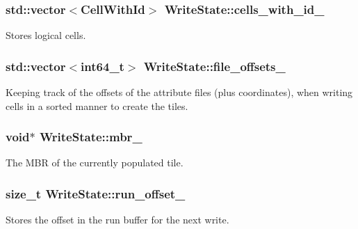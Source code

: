 \subsubsection[{cells\+\_\+with\+\_\+id\+\_\+}]{\setlength{\rightskip}{0pt plus 5cm}std\+::vector$<${\bf Cell\+With\+Id}$>$ Write\+State\+::cells\+\_\+with\+\_\+id\+\_\+\hspace{0.3cm}{\ttfamily [private]}}\label{structWriteState_a296e22c27c0c1965771670d3bdd2dfd5}
Stores logical cells. \hypertarget{structWriteState_a94e403575a527bf5b592cd56b37312a9}{}
\subsubsection[{file\+\_\+offsets\+\_\+}]{\setlength{\rightskip}{0pt plus 5cm}std\+::vector$<$int64\+\_\+t$>$ Write\+State\+::file\+\_\+offsets\+\_\+\hspace{0.3cm}{\ttfamily [private]}}\label{structWriteState_a94e403575a527bf5b592cd56b37312a9}
Keeping track of the offsets of the attribute files (plus coordinates), when writing cells in a sorted manner to create the tiles. \hypertarget{structWriteState_a263affe5c47bb910058cda181facd393}{}
\subsubsection[{mbr\+\_\+}]{\setlength{\rightskip}{0pt plus 5cm}void$\ast$ Write\+State\+::mbr\+\_\+\hspace{0.3cm}{\ttfamily [private]}}\label{structWriteState_a263affe5c47bb910058cda181facd393}
The M\+B\+R of the currently populated tile. \hypertarget{structWriteState_aa81ec074dba266202c72f1dc5b34d28a}{}
\subsubsection[{run\+\_\+offset\+\_\+}]{\setlength{\rightskip}{0pt plus 5cm}size\+\_\+t Write\+State\+::run\+\_\+offset\+\_\+\hspace{0.3cm}{\ttfamily [private]}}\label{structWriteState_aa81ec074dba266202c72f1dc5b34d28a}
Stores the offset in the run buffer for the next write. \hypertarget{structWriteState_a77bff60be493ad28638135d43f4929c5}{}

